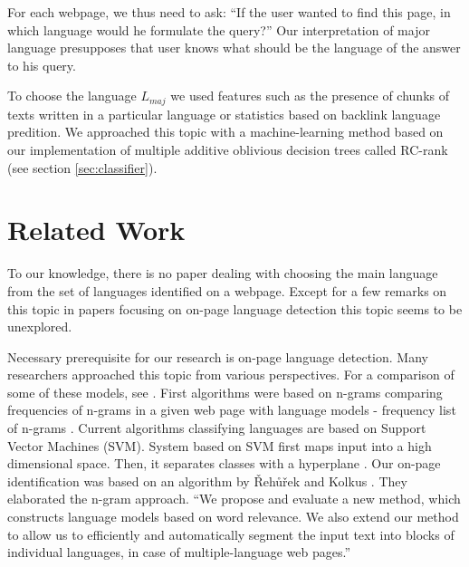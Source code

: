 \documentclass{acm_proc_article-sp}
\begin{document}
  For each webpage, we thus need to ask: “If the user wanted to find this page, in which language would he formulate the query?” 
  Our interpretation of major language presupposes that user knows what should be the language of the answer to his query.

  To choose the language $L_{maj}$ we used features such as the presence of chunks of texts written in a particular language or statistics based on 
  backlink language predition. 
  We approached this topic with a machine-learning method based on our implementation of multiple additive oblivious decision trees called RC-rank (see section \ref{sec:classifier}).

\section{Related Work}

  To our knowledge, there is no paper dealing with choosing the main language from the set
  of languages identified on a webpage. Except for a few remarks on this topic in papers 
  focusing on on-page language detection this topic seems to be unexplored. 
  
  Necessary prerequisite for our research is on-page language detection. Many researchers approached this topic
  from various perspectives. For a comparison of some of these models, see \cite{Baldwin:shortlong}. 
  First algorithms were based on n-grams comparing frequencies of n-grams in a given web page with 
  language models - frequency list of n-grams \cite{trenkle:ngram}. Current algorithms classifying languages 
  are based on Support Vector Machines (SVM). System based on SVM first maps input into a high dimensional space. 
  Then, it separates classes with a hyperplane \cite{Campbell:supportvector, Lodhi:textclass}.
  Our on-page identification was based on an algorithm by Řehůřek and Kolkus \cite{Rehurek:languageidentification}.  They elaborated the n-gram approach. 
  “We propose and evaluate a new method, which constructs language models based on word relevance. We also 
  extend our method to allow us to efficiently and automatically segment the input text into blocks of individual 
  languages, in case of multiple-language web pages.” \cite{Rehurek:languageidentification}
  
\end{document}
